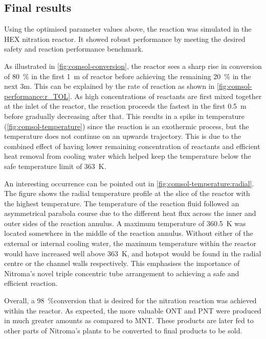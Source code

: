 \subsection{Final results}
\label{finalresults}
Using the optimised parameter values above, the reaction was simulated in the HEX nitration reactor. It showed robust performance by meeting the desired safety and reaction performance benchmark.

As illustrated in \cref{fig:comsol-conversion}, the reactor sees a sharp rise in conversion of \approx \SI{80}{\percent} in the first \SI{1}{\metre} of reactor before achieving the remaining \SI{20}{\percent} in the next \approx 3m. This can be explained by the rate of reaction as shown in \cref{fig:comsol-performance:r_TOL}. As high concentrations of reactants are first mixed together at the inlet of the reactor, the reaction proceeds the fastest in the first \SI{0.5}{\metre} before gradually decreasing after that. This results in a spike in temperature (\cref{fig:comsol-temperature}) since the reaction is an exothermic process, but the temperature does not continue on an upwards trajectory. This is due to the combined effect of having lower remaining concentration of reactants and efficient heat removal from cooling water which helped keep the temperature below the safe temperature limit of \SI{363}{\K}. 

An interesting occurrence can be pointed out in \cref{fig:comsol-temperature:radial}. The figure shows the radial temperature profile at the slice of the reactor with the highest temperature. The temperature of the reaction fluid followed an asymmetrical parabola course due to the different heat flux across the inner and outer sides of the reaction annulus. A maximum temperature of \approx \SI{360.5}{\K} was located somewhere in the middle of the reaction annulus. Without either of the external or internal cooling water, the maximum temperature within the reactor would have increased well above \SI{363}{\K}, and hotspot would be found in the radial centre or the channel walls respectively. This emphasises the importance of Nitroma's novel triple concentric tube arrangement to achieving a safe and efficient reaction.

Overall, a \SI{98}{\%}conversion that is desired for the nitration reaction was achieved within the reactor. As expected, the more valuable ONT and PNT were produced in much greater amounts as compared to MNT. These products are later fed to other parts of Nitroma's plants to be converted to final products to be sold.

